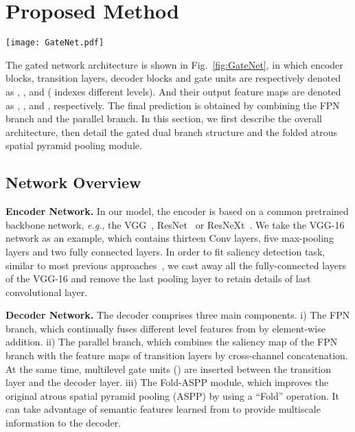 \documentclass[runningheads]{llncs}
\begin{document}
	\section{Proposed Method}
	\begin{figure*}
		\texttt{[image: GateNet.pdf]}\\ \centering
		\caption{The overall architecture of the gated network. It consists of   the VGG-16 encoder (), five transition layers (), five gate units (), five decoder blocks () and the {Fold-ASPP} module. We employ twice supervision in this network. Once acts at the end of the FPN branch . The other is used to guide the fusion of the two branches.} 		
		\label{fig:GateNet}
\end{figure*} 
	The gated network architecture is shown in Fig.~\ref{fig:GateNet}, in which encoder blocks, transition layers, decoder blocks and  gate units are respectively denoted as ,  ,  and   ( indexes different levels). And their output feature maps are denoted as , ,  and , respectively. 
	The final prediction is obtained by combining the FPN branch and the parallel branch.  
	In this section, we first describe the overall architecture, then detail the gated dual branch structure and the folded atrous spatial pyramid pooling module.
	\subsection{Network Overview}\label{sec:Network}
	\noindent\textbf{Encoder Network.} In our model, the encoder is based on a common pretrained backbone network, \textit{e.g.}, the VGG~\cite{VGG}, ResNet~\cite{Resnet} or ResNeXt~\cite{ResNext}. We take the VGG-16 network as an example, which contains thirteen Conv layers, five max-pooling layers and two fully connected layers. In order to fit saliency detection task, similar to most previous approaches~\cite{Amulet,DSS,PAGRN,BMPM}, we cast away all the fully-connected layers of the VGG-16 and remove the last pooling layer to retain details of last convolutional layer. 
	
	\noindent\textbf{Decoder Network.} The decoder comprises three main components. i) The FPN branch, which continually fuses different level features from  by element-wise addition. ii) The parallel branch, which combines the saliency map of the FPN branch with the feature maps of transition layers by cross-channel concatenation. At the same time, multilevel gate units () are inserted between the transition layer and the decoder layer. 
	iii) The Fold-ASPP module, which improves the original atrous spatial pyramid pooling (ASPP) by using a ``Fold'' operation. It can take advantage of semantic features learned from  to provide multiscale information to the decoder.
	
\end{document}
